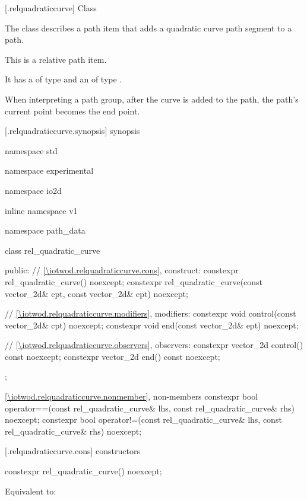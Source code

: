  [\iotwod.relquadraticcurve] {Class }%

\pnum
{}%
The class  describes a path item that adds a quadratic \bezierlocal curve path segment to a path.

\pnum
This is a relative path item.

\pnum
It has a  of type  and an  of type .

\pnum
When interpreting a path group, after the curve is added to the path, the path's current point becomes the end point.


 [\iotwod.relquadraticcurve.synopsis] { synopsis}%

\begin{codeblock}
namespace std { namespace experimental { namespace io2d { inline namespace v1 {
  namespace path_data {
    class rel_quadratic_curve {
    public:
      // \ref{\iotwod.relquadraticcurve.cons}, construct:
      constexpr rel_quadratic_curve() noexcept;
      constexpr rel_quadratic_curve(const vector_2d& cpt, const vector_2d& ept)
        noexcept;

      // \ref{\iotwod.relquadraticcurve.modifiers}, modifiers:
      constexpr void control(const vector_2d& cpt) noexcept;
      constexpr void end(const vector_2d& ept) noexcept;

      // \ref{\iotwod.relquadraticcurve.observers}, observers:
      constexpr vector_2d control() const noexcept;
      constexpr vector_2d end() const noexcept;
    };
    
    \ref{\iotwod.relquadraticcurve.nonmember}, non-members
    constexpr bool operator==(const rel_quadratic_curve& lhs,
      const rel_quadratic_curve& rhs) noexcept;
    constexpr bool operator!=(const rel_quadratic_curve& lhs,
      const rel_quadratic_curve& rhs) noexcept;
  }
} } } }
\end{codeblock}

 [\iotwod.relquadraticcurve.cons] { constructors}%

%
\begin{itemdecl}
constexpr rel_quadratic_curve() noexcept;
\end{itemdecl}
\begin{itemdescr}
\pnum
\effects
Equivalent to: 
\end{itemdescr}


